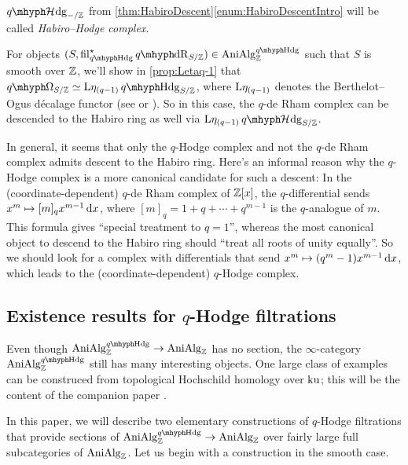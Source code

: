 \documentclass[DIV=12,numbers=enddot,leqno,bibliography=totoc]{scrartcl}
\begin{document}
	\begin{defi}
		$\qHhodge_{-/\IZ}$ from \cref{thm:HabiroDescent}\cref{enum:HabiroDescentIntro} will be called \emph{Habiro--Hodge complex}.
	\end{defi}
	\begin{rem}
		For objects $(S,\fil_{\qHodge}^\star\qdeRham_{S/\IZ})\in\cat{AniAlg}_\IZ^{\qHodge}$ such that $S$ is smooth over $\mathbb{Z}$, we'll show in \cref{prop:Letaq-1} that $\qOmega_{S/\IZ}\simeq \L\eta_{(q-1)}\qHodge_{S/\IZ}$, where $\mathrm{L}\eta_{(q-1)}$ denotes the Berthelot--Ogus décalage functor (see \cite[\S{}]{BMS1} or \cite[]{Stacks}). So in this case, the $q$-de Rham complex can be descended to the Habiro ring as well via $\L\eta_{(q-1)}\qHhodge_{S/\IZ}$.
		
		In general, it seems that only the $q$-Hodge complex and not the $q$-de Rham complex admits descent to the Habiro ring. Here's an informal reason why the $q$-Hodge complex is a more canonical candidate for such a descent: In the (coordinate-dependent) $q$-de Rham complex of $\mathbb{Z}[x]$, the $q$-differential sends $x^m\mapsto [m]_q x^{m-1}\mathop{}\!\mathrm{d} x$, where $[m]_q=1+q+\dotsb+q^{m-1}$ is the $q$-analogue of $m$. This formula gives \enquote{special treatment to $q=1$}, whereas the most canonical object to descend to the Habiro ring should \enquote{treat all roots of unity equally}. So we should look for a complex with differentials that send $x^m\mapsto (q^m-1)x^{m-1}\mathop{}\!\mathrm{d} x$, which leads to the (coordinate-dependent) $q$-Hodge complex.
	\end{rem}
	
	\subsection{Existence results for \texorpdfstring{$q$}{q}-Hodge filtrations}\label{subsec:FunctorialqHodgeIntro}
	
	Even though $\cat{AniAlg}_\IZ^{\qHodge}\rightarrow \cat{AniAlg}_\IZ$ has no section, the $\infty$-category $\cat{AniAlg}_\IZ^{\qHodge}$ still has many interesting objects. One large class of examples can be construced from topological Hochschild homology over $\mathrm{ku}$; this will be the content of the companion paper \cite{qdeRhamku}.
	
	In this paper, we will describe two elementary constructions of $q$-Hodge filtrations that provide sections of $\cat{AniAlg}_\IZ^{\qHodge}\rightarrow \cat{AniAlg}_\IZ$ over fairly large full subcategories of $\mathrm{AniAlg}_{\mathbb{Z}}$. Let us begin with a construction in the smooth case.
	
\end{document}
